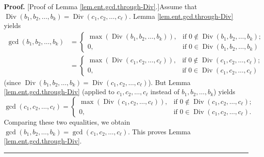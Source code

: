 \documentclass[numbers=enddot,12pt,final,onecolumn,notitlepage]{scrartcl}%
\numberwithin{exer}{subsection}
\theoremstyle{definition}
\newenvironment{proof}[1][Proof]{\noindent\textbf{#1.} }{\ \rule{0.5em}{0.5em}}
\begin{document}
\begin{proof}
[Proof of Lemma \ref{lem.ent.gcd.through-Div}.]Assume that
$\operatorname*{Div}\left(  b_{1},b_{2},\ldots,b_{k}\right)
=\operatorname*{Div}\left(  c_{1},c_{2},\ldots,c_{\ell}\right)  $. Lemma
\ref{lem.ent.gcd.through-Div} yields%
\begin{align*}
\gcd\left(  b_{1},b_{2},\ldots,b_{k}\right)   &  =%
\begin{cases}
\max\left(  \operatorname*{Div}\left(  b_{1},b_{2},\ldots,b_{k}\right)
\right)  , & \text{if }0\notin\operatorname*{Div}\left(  b_{1},b_{2}%
,\ldots,b_{k}\right)  ;\\
0, & \text{if }0\in\operatorname*{Div}\left(  b_{1},b_{2},\ldots,b_{k}\right)
\end{cases}
\\
&  =%
\begin{cases}
\max\left(  \operatorname*{Div}\left(  c_{1},c_{2},\ldots,c_{\ell}\right)
\right)  , & \text{if }0\notin\operatorname*{Div}\left(  c_{1},c_{2}%
,\ldots,c_{\ell}\right)  ;\\
0, & \text{if }0\in\operatorname*{Div}\left(  c_{1},c_{2},\ldots,c_{\ell
}\right)
\end{cases}
\end{align*}
(since $\operatorname*{Div}\left(  b_{1},b_{2},\ldots,b_{k}\right)
=\operatorname*{Div}\left(  c_{1},c_{2},\ldots,c_{\ell}\right)  $). But Lemma
\ref{lem.ent.gcd.through-Div} (applied to $c_{1},c_{2},\ldots,c_{\ell}$
instead of $b_{1},b_{2},\ldots,b_{k}$) yields%
\[
\gcd\left(  c_{1},c_{2},\ldots,c_{\ell}\right)  =%
\begin{cases}
\max\left(  \operatorname*{Div}\left(  c_{1},c_{2},\ldots,c_{\ell}\right)
\right)  , & \text{if }0\notin\operatorname*{Div}\left(  c_{1},c_{2}%
,\ldots,c_{\ell}\right)  ;\\
0, & \text{if }0\in\operatorname*{Div}\left(  c_{1},c_{2},\ldots,c_{\ell
}\right)  .
\end{cases}
\]
Comparing these two equalities, we obtain $\gcd\left(  b_{1},b_{2}%
,\ldots,b_{k}\right)  =\gcd\left(  c_{1},c_{2},\ldots,c_{\ell}\right)  $. This
proves Lemma \ref{lem.ent.gcd.through-Div}.
\end{proof}
\end{document}
